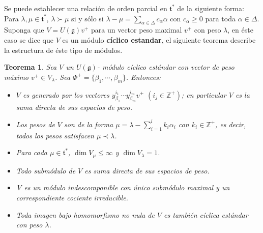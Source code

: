 \documentclass[11pt,a4paper]{article}
\newtheorem{theorem}{Teorema}
\newcommand{\mfg}{\mathfrak{g}}
\begin{document}
Se puede establecer una relación de orden parcial en $\mathfrak{t}^*$ de la siguiente forma: Para $\lambda , \mu \in \mathfrak{t}^*$, $\lambda \succ \mu$ si y sólo si $\lambda - \mu =\sum_{\alpha \in \Delta}c_{\alpha}\alpha$ con $c_\alpha\geq 0$ para toda $ \alpha \in \Delta$. Suponga que $V= U(\mfg)v^+$ para  un vector peso maximal $v^+$ con peso $\lambda$, en éste caso se dice que $V$ es un módulo \textbf{cíclico estandar}, el siguiente teorema describe la estructura de éste tipo de módulos. 

\begin{theorem}
Sea $V$ un $U(\mfg)$- módulo cíclico estándar con vector de peso máximo $v^+ \in V_{\lambda}$. Sea $\Phi^+ = \{ \beta_1, \cdots, \beta_m\}$. Entonces:
\begin{itemize}
    \item[a)] $V$ es generado por los vectores $y_{\beta_1}^{i_1}\cdots y_{\beta_m}^{i_m}v^+$  $(i_j\in  \mathbb{Z}^+)$; en particular $V$ es la suma directa de sus espacios de peso.
    \item[b)] Los pesos de $V$ son de la forma $\mu= \lambda- \sum_{i=1}^l k_i \alpha_i$ con $k_i\in \mathbb{Z}^+$, es decir, todos los pesos satisfacen $\mu \prec \lambda$.
    \item[c)] Para cada $\mu \in \mathfrak{t}^*$, $\dim V_{\mu}\leq \infty$ y $\dim V_{\lambda}=1$.
    \item[d)] Todo submódulo de $V$ es suma directa de sus espacios de peso.
    \item[e)] V es un módulo indescomponible con único  submódulo maximal y un correspondiente cociente irreducible.
    \item[f)] Toda imagen bajo homomorfismo no nula de $V$ es también cíclica estándar con peso $\lambda$.
\end{itemize}
\end{theorem}
\end{document}
